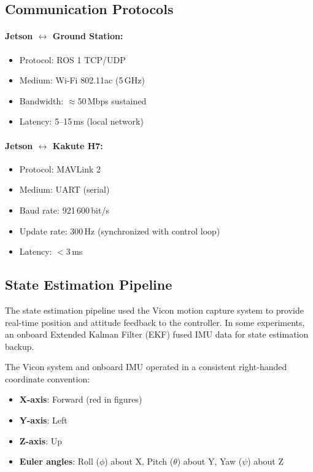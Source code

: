 \subsection{Communication Protocols}

\paragraph{Jetson $\leftrightarrow$ Ground Station:}
\begin{itemize}
\item Protocol: ROS 1 TCP/UDP
\item Medium: Wi-Fi 802.11ac (5\,GHz)
\item Bandwidth: $\approx$50\,Mbps sustained
\item Latency: 5--15\,ms (local network)
\end{itemize}

\paragraph{Jetson $\leftrightarrow$ Kakute H7:}
\begin{itemize}
\item Protocol: MAVLink 2
\item Medium: UART (serial)
\item Baud rate: 921\,600\,bit/s
\item Update rate: 300\,Hz (synchronized with control loop)
\item Latency: $<$3\,ms
\end{itemize}

\subsection{State Estimation Pipeline}

The state estimation pipeline used the Vicon motion capture system to provide real-time position and attitude feedback to the controller. In some experiments, an onboard Extended Kalman Filter (EKF) fused IMU data for state estimation backup.

The Vicon system and onboard IMU operated in a consistent right-handed coordinate convention:
\begin{itemize}
\item \textbf{X-axis}: Forward (red in figures)
\item \textbf{Y-axis}: Left
\item \textbf{Z-axis}: Up
\item \textbf{Euler angles}: Roll ($\phi$) about X, Pitch ($\theta$) about Y, Yaw ($\psi$) about Z
\end{itemize}

